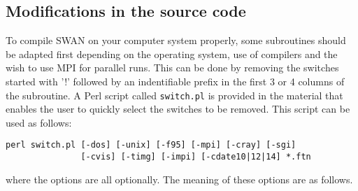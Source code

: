 \documentclass[12pt]{book}
\begin{document}
\subsection{Modifications in the source code}

To compile SWAN on your computer system properly, some subroutines should be adapted first
depending on the operating system, use of compilers and the wish to use MPI for
parallel runs. This can be done by removing the switches started with '!' followed by an
indentifiable prefix in the first 3 or 4 columns of the subroutine. A Perl script called
{\tt switch.pl} is provided in the material that enables the user to quickly select the
switches to be removed. This script can be used as follows:
\begin{verbatim}
perl switch.pl [-dos] [-unix] [-f95] [-mpi] [-cray] [-sgi]
               [-cvis] [-timg] [-impi] [-cdate10|12|14] *.ftn
\end{verbatim}
where the options are all optionally. The meaning of these options are as follows.
\end{document}
